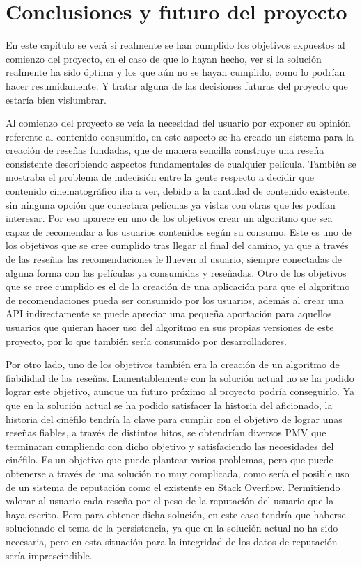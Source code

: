\chapter{Conclusiones y futuro del proyecto}

En este capítulo se verá si realmente se han cumplido los objetivos expuestos al comienzo del 
proyecto, en el caso de que lo hayan hecho, ver si la solución realmente ha sido óptima y los que aún no se hayan 
cumplido, como lo podrían hacer resumidamente. Y tratar alguna de las decisiones futuras del proyecto que estaría bien 
vislumbrar.

Al comienzo del proyecto se veía la necesidad del usuario por exponer su opinión referente al contenido consumido, en 
este aspecto se ha creado un sistema para la creación de reseñas fundadas, que de manera sencilla construye una reseña 
consistente describiendo aspectos fundamentales de cualquier película. También se mostraba el problema de indecisión 
entre la gente respecto a decidir que contenido cinematográfico iba a ver, debido a la cantidad de contenido existente, 
sin ninguna opción que conectara películas ya vistas con otras que les podían interesar. Por eso aparece en uno de los 
objetivos crear un algoritmo que sea capaz de recomendar a los usuarios contenidos según su consumo. Este es uno de los 
objetivos que se cree cumplido tras llegar al final del camino, ya que a través de las reseñas las recomendaciones le 
llueven al usuario, siempre conectadas de alguna forma con las películas ya consumidas y reseñadas. Otro de los 
objetivos que se cree cumplido es el de la creación de una aplicación para que el algoritmo de recomendaciones pueda ser 
consumido por los usuarios, además al crear una API indirectamente se puede apreciar una pequeña aportación para 
aquellos usuarios que quieran hacer uso del algoritmo en sus propias versiones de este proyecto, por lo que también 
sería consumido por desarrolladores.

Por otro lado, uno de los objetivos también era la creación de un algoritmo de fiabilidad de las reseñas. 
Lamentablemente con la solución actual no se ha podido lograr este objetivo, aunque un futuro próximo al proyecto podría 
conseguirlo. Ya que en la solución actual se ha podido satisfacer la historia del aficionado, la historia del cinéfilo 
tendría la clave para cumplir con el objetivo de lograr unas reseñas fiables, a través de distintos hitos, se obtendrían 
diversos PMV que terminaran cumpliendo con dicho objetivo y satisfaciendo las necesidades del cinéfilo. Es un objetivo 
que puede plantear varios problemas, pero que puede obtenerse a través de una solución no muy complicada, como sería el 
posible uso de un sistema de reputación como el existente en Stack Overflow. Permitiendo valorar al usuario cada reseña 
por el peso de la reputación del usuario que la haya escrito. Pero para obtener dicha solución, en este caso tendría que 
haberse solucionado el tema de la persistencia, ya que en la solución actual no ha sido necesaria, pero en esta 
situación para la integridad de los datos de reputación sería imprescindible.

